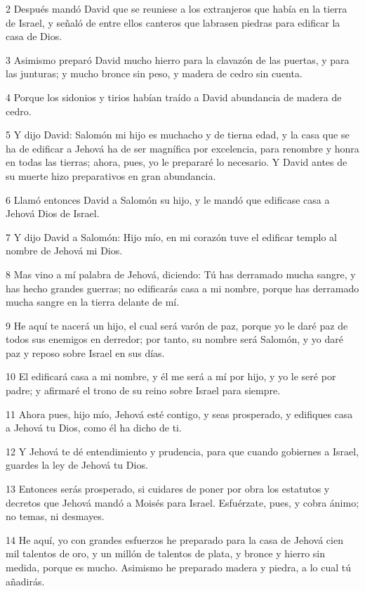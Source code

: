 \par 2 Después mandó David que se reuniese a los extranjeros que había en la tierra de Israel, y señaló de entre ellos canteros que labrasen piedras para edificar la casa de Dios.
\par 3 Asimismo preparó David mucho hierro para la clavazón de las puertas, y para las junturas; y mucho bronce sin peso, y madera de cedro sin cuenta.
\par 4 Porque los sidonios y tirios habían traído a David abundancia de madera de cedro.
\par 5 Y dijo David: Salomón mi hijo es muchacho y de tierna edad, y la casa que se ha de edificar a Jehová ha de ser magnífica por excelencia, para renombre y honra en todas las tierras; ahora, pues, yo le prepararé lo necesario. Y David antes de su muerte hizo preparativos en gran abundancia.
\par 6 Llamó entonces David a Salomón su hijo, y le mandó que edificase casa a Jehová Dios de Israel.
\par 7 Y dijo David a Salomón: Hijo mío, en mi corazón tuve el edificar templo al nombre de Jehová mi Dios.
\par 8 Mas vino a mí palabra de Jehová, diciendo: Tú has derramado mucha sangre, y has hecho grandes guerras; no edificarás casa a mi nombre, porque has derramado mucha sangre en la tierra delante de mí.
\par 9 He aquí te nacerá un hijo, el cual será varón de paz, porque yo le daré paz de todos sus enemigos en derredor; por tanto, su nombre será Salomón, y yo daré paz y reposo sobre Israel en sus días.
\par 10 El edificará casa a mi nombre, y él me será a mí por hijo, y yo le seré por padre; y afirmaré el trono de su reino sobre Israel para siempre. 
\par 11 Ahora pues, hijo mío, Jehová esté contigo, y seas prosperado, y edifiques casa a Jehová tu Dios, como él ha dicho de ti.
\par 12 Y Jehová te dé entendimiento y prudencia, para que cuando gobiernes a Israel, guardes la ley de Jehová tu Dios.
\par 13 Entonces serás prosperado, si cuidares de poner por obra los estatutos y decretos que Jehová mandó a Moisés para Israel. Esfuérzate, pues, y cobra ánimo; no temas, ni desmayes. 
\par 14 He aquí, yo con grandes esfuerzos he preparado para la casa de Jehová cien mil talentos de oro,  y un millón de talentos de plata, y bronce y hierro sin medida, porque es mucho. Asimismo he preparado madera y piedra, a lo cual tú añadirás.
